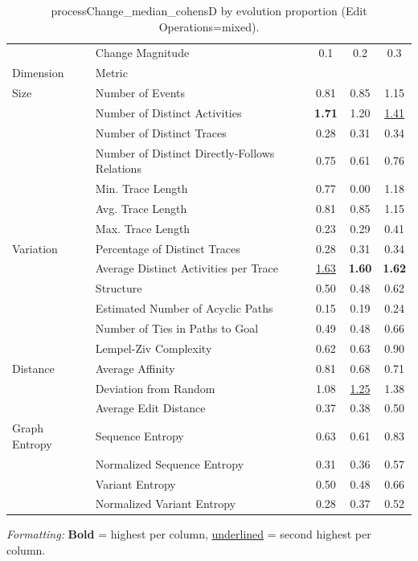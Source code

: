 \begin{table}[H]
\centering
\scriptsize
\caption{processChange_median_cohensD by evolution proportion (Edit Operations=mixed).}
\label{tab:processchange-median-cohensd-by-evolutionproportion}
\setlength{\tabcolsep}{2pt}  %
\begin{tabular}{llccc}
\toprule
              & Change Magnitude &  0.1 &  0.2 &  0.3 \\
Dimension & Metric &      &      &      \\
\midrule
Size & Number of Events & 0.81 & 0.85 & 1.15 \\
              & Number of Distinct Activities & \textbf{1.71} & 1.20 & \underline{1.41} \\
              & Number of Distinct Traces & 0.28 & 0.31 & 0.34 \\
              & Number of Distinct Directly-Follows Relations & 0.75 & 0.61 & 0.76 \\
              & Min. Trace Length & 0.77 & 0.00 & 1.18 \\
              & Avg. Trace Length & 0.81 & 0.85 & 1.15 \\
              & Max. Trace Length & 0.23 & 0.29 & 0.41 \\
Variation & Percentage of Distinct Traces & 0.28 & 0.31 & 0.34 \\
              & Average Distinct Activities per Trace & \underline{1.63} & \textbf{1.60} & \textbf{1.62} \\
              & Structure & 0.50 & 0.48 & 0.62 \\
              & Estimated Number of Acyclic Paths & 0.15 & 0.19 & 0.24 \\
              & Number of Ties in Paths to Goal & 0.49 & 0.48 & 0.66 \\
              & Lempel-Ziv Complexity & 0.62 & 0.63 & 0.90 \\
Distance & Average Affinity & 0.81 & 0.68 & 0.71 \\
              & Deviation from Random & 1.08 & \underline{1.25} & 1.38 \\
              & Average Edit Distance & 0.37 & 0.38 & 0.50 \\
Graph Entropy & Sequence Entropy & 0.63 & 0.61 & 0.83 \\
              & Normalized Sequence Entropy & 0.31 & 0.36 & 0.57 \\
              & Variant Entropy & 0.50 & 0.48 & 0.66 \\
              & Normalized Variant Entropy & 0.28 & 0.37 & 0.52 \\
\bottomrule
\end{tabular}
\vspace{2pt}
\begin{minipage}{\linewidth}
\centering
\scriptsize
\tiny
\textit{Formatting:} \textbf{Bold} = highest per column, \underline{underlined} = second highest per column.
\end{minipage}
\end{table}
